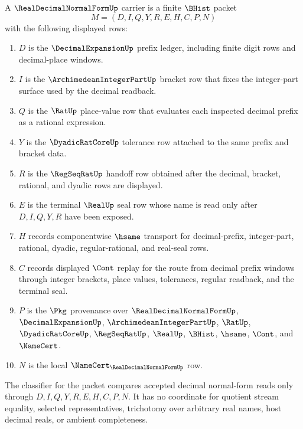 \begin{definition}
\label{def:real-decimal-normal-form-carrier}
A $\RealDecimalNormalFormUp$ carrier is a finite $\BHist$ packet
$$
M=(D,I,Q,Y,R,E,H,C,P,N)
$$
with the following displayed rows:
\begin{enumerate}
\item $D$ is the $\DecimalExpansionUp$ prefix ledger, including finite digit
  rows and decimal-place windows.
\item $I$ is the $\ArchimedeanIntegerPartUp$ bracket row that fixes the
  integer-part surface used by the decimal readback.
\item $Q$ is the $\RatUp$ place-value row that evaluates each inspected
  decimal prefix as a rational expression.
\item $Y$ is the $\DyadicRatCoreUp$ tolerance row attached to the same
  prefix and bracket data.
\item $R$ is the $\RegSeqRatUp$ handoff row obtained after the decimal,
  bracket, rational, and dyadic rows are displayed.
\item $E$ is the terminal $\RealUp$ seal row whose name is read only after
  $D,I,Q,Y,R$ have been exposed.
\item $H$ records componentwise $\hsame$ transport for decimal-prefix,
  integer-part, rational, dyadic, regular-rational, and real-seal rows.
\item $C$ records displayed $\Cont$ replay for the route from decimal prefix
  windows through integer brackets, place values, tolerances, regular
  readback, and the terminal seal.
\item $P$ is the $\Pkg$ provenance over $\RealDecimalNormalFormUp$,
  $\DecimalExpansionUp$, $\ArchimedeanIntegerPartUp$, $\RatUp$,
  $\DyadicRatCoreUp$, $\RegSeqRatUp$, $\RealUp$, $\BHist$, $\hsame$,
  $\Cont$, and $\NameCert$.
\item $N$ is the local $\NameCert_{\RealDecimalNormalFormUp}$ row.
\end{enumerate}
The classifier for the packet compares accepted decimal normal-form reads
only through $D,I,Q,Y,R,E,H,C,P,N$. It has no coordinate for quotient stream
equality, selected representatives, trichotomy over arbitrary real names,
host decimal reals, or ambient completeness.
\end{definition}

